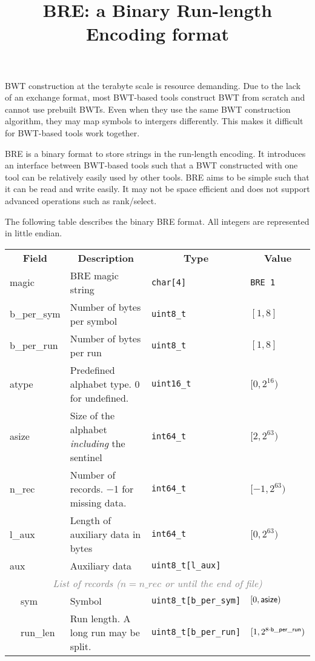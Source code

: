 \documentclass[10pt]{article}
\title{BRE: a Binary Run-length Encoding format}
\author{}
\date{\vspace{-8ex}}
\begin{document}
\maketitle

{\small
BWT construction at the terabyte scale is resource demanding.
Due to the lack of an exchange format, most BWT-based tools construct BWT from scratch and cannot use prebuilt BWTs.
Even when they use the same BWT construction algorithm, they may map symbols to intergers differently.
This makes it difficult for BWT-based tools work together.

BRE is a binary format to store strings in the run-length encoding.
It introduces an interface between BWT-based tools such that a BWT constructed with one tool can be relatively easily used by other tools.
BRE aims to be simple such that it can be read and write easily.
It may not be space efficient and does not support advanced operations such as rank/select.

The following table describes the binary BRE format.
All integers are represented in little endian.
}
\begin{table}[ht]
\centering
{\small
\begin{tabular}{|l|l|p{7.0cm}|l|l|}
  \cline{1-5}
  \multicolumn{2}{|c|}{\bf Field} & \multicolumn{1}{c|}{\bf Description} & \multicolumn{1}{c|}{\bf Type} & \multicolumn{1}{c|}{\bf Value} \\\cline{1-5}
  \multicolumn{2}{|l|}{\sf magic} & BRE magic string & {\tt char[4]} & {\tt BRE\char92 1}\\\cline{1-5}
  \multicolumn{2}{|l|}{\sf b\_per\_sym} & Number of bytes per symbol & {\tt uint8\_t} & $[1,8]$ \\\cline{1-5}
  \multicolumn{2}{|l|}{\sf b\_per\_run} & Number of bytes per run & {\tt uint8\_t} & $[1,8]$ \\\cline{1-5}
  \multicolumn{2}{|l|}{\sf atype} & Predefined alphabet type. 0 for undefined. & {\tt uint16\_t} & $[0,2^{16})$ \\\cline{1-5}
  \multicolumn{2}{|l|}{\sf asize} & Size of the alphabet \emph{including} the sentinel & {\tt int64\_t} & $[2,2^{63})$ \\\cline{1-5}
  \multicolumn{2}{|l|}{\sf n\_rec} & Number of records. $-$1 for missing data. & {\tt int64\_t} & $[-1,2^{63})$ \\\cline{1-5}
  \multicolumn{2}{|l|}{\sf l\_aux} & Length of auxiliary data in bytes & {\tt int64\_t} & $[0,2^{63})$ \\\cline{1-5}
  \multicolumn{2}{|l|}{\sf aux} & Auxiliary data & {\tt uint8\_t[l\_aux]} & \\\cline{1-5}
  \multicolumn{5}{|c|}{\textcolor{gray}{\it List of records ($n=n\_rec$ or until the end of file)}} \\\cline{2-5}
  & {\sf sym} & Symbol & {\tt uint8\_t[b\_per\_sym]} & $[0,{\sf asize})$ \\\cline{2-5}
  & {\sf run\_len} & Run length. A long run may be split. & {\tt uint8\_t[b\_per\_run]} & $[1,2^{8\cdot{\sf b\_per\_run}})$ \\\cline{2-5}
  \cline{1-5}
\end{tabular}}
\end{table}
\end{document}

